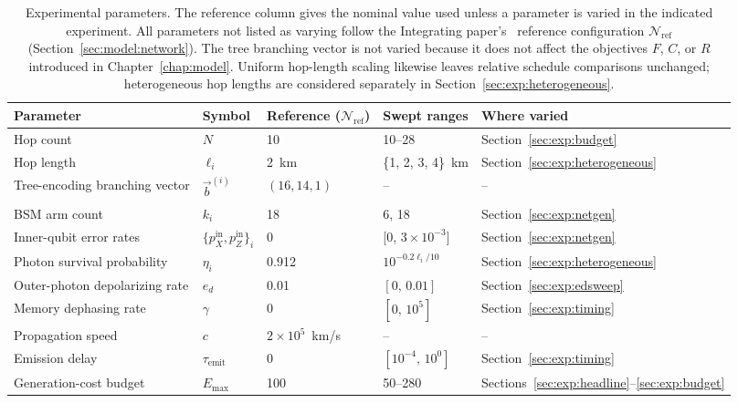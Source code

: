 \begin{table}[ht]
    \centering
    \small
    \begin{tabular}{p{5cm}lllp{3cm}}
        \toprule
        Parameter & Symbol & Reference ($\mathcal{N}_{\mathrm{ref}}$) & Swept ranges & Where varied \\
        \midrule
        Hop count & $N$ & 10 & 10--28 & Section~\ref{sec:exp:budget} \\
        Hop length & $\ell_i$ & 2~km & \{1, 2, 3, 4\}~km & Section~\ref{sec:exp:heterogeneous} \\
        Tree-encoding branching vector & $\vec b^{(i)}$ & $(16,14,1)$ & -- & -- \\
        BSM arm count & $k_i$ & 18 & 6, 18 & Section~\ref{sec:exp:netgen} \\
        Inner-qubit error rates & $\{p_X^{\mathrm{in}},p_Z^{\mathrm{in}}\}_i$ & 0 & [0, $3\!\times\!10^{-3}$] & Section~\ref{sec:exp:netgen} \\
        Photon survival probability & $\eta_i$ & 0.912 & $10^{-0.2 \ell_i/10}$ & Section~\ref{sec:exp:heterogeneous} \\
        Outer-photon depolarizing rate & $e_d$ & 0.01 & $[0,\,0.01]$ & Section~\ref{sec:exp:edsweep} \\
        Memory dephasing rate & $\gamma$ & 0 & $[0,\,10^5]$ & Section~\ref{sec:exp:timing} \\
        Propagation speed & $c$ & $2\!\times\!10^5$~km/s & -- & -- \\
        Emission delay & $\tau_{\mathrm{emit}}$ & 0 & $[10^{-4},\,10^{0}]$ & Section~\ref{sec:exp:timing} \\
        Generation-cost budget & $E_{\max}$ & 100 & 50--280 & Sections~\ref{sec:exp:headline}--\ref{sec:exp:budget} \\
        \bottomrule
    \end{tabular}

    \caption[Experimental parameters and swept ranges]{Experimental parameters. The reference column gives the nominal value used unless a parameter is varied in the indicated experiment. All parameters not listed as varying follow the Integrating paper's~\cite{Benchasattabuse2025Integrating} reference configuration $\mathcal{N}_{\mathrm{ref}}$ (Section~\ref{sec:model:network}). The tree branching vector is not varied because it does not affect the objectives $F$, $C$, or $R$ introduced in Chapter~\ref{chap:model}. Uniform hop-length scaling likewise leaves relative schedule comparisons unchanged; heterogeneous hop lengths are considered separately in Section~\ref{sec:exp:heterogeneous}.}
    \label{tab:params}
\end{table}